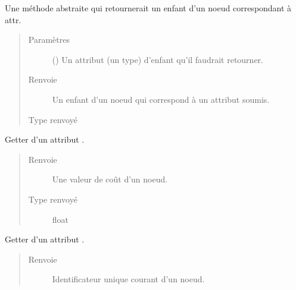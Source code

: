 \documentclass[letterpaper,10pt,french]{sphinxmanual}
\begin{document}
\begin{fulllineitems}
\begin{fulllineitems}
\label{\detokenize{index:StrategyTree.NodeST.get_child_by_attribute}}
Une méthode abstraite qui retournerait un enfant d’un noeud correspondant à attr.
\begin{quote}\begin{description}
\item[{Paramètres}] \leavevmode
{} () \textendash{} Un attribut (un type) d’enfant qu’il faudrait retourner.

\item[{Renvoie}] \leavevmode
{} \textendash{} Un enfant d’un noeud qui correspond à un attribut soumis.

\item[{Type renvoyé}] \leavevmode
{\hyperref[\detokenize{index:StrategyTree.NodeST}]{}}

\end{description}\end{quote}

\end{fulllineitems}


\begin{fulllineitems}
\label{\detokenize{index:StrategyTree.NodeST.get_cost}}
Getter d’un attribut .
\begin{quote}\begin{description}
\item[{Renvoie}] \leavevmode
{} \textendash{} Une valeur de coût d’un noeud.

\item[{Type renvoyé}] \leavevmode
float

\end{description}\end{quote}

\end{fulllineitems}


\begin{fulllineitems}
\label{\detokenize{index:StrategyTree.NodeST.get_id}}
Getter d’un attribut .
\begin{quote}\begin{description}
\item[{Renvoie}] \leavevmode
{} \textendash{} Identificateur unique courant d’un noeud.


\end{description}
\end{quote}
\end{fulllineitems}
\end{fulllineitems}
\end{document}

